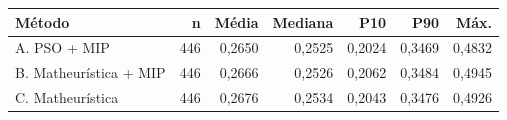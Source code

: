 \begin{tabular}{lrrrrrr}
\toprule
Método & n & Média & Mediana & P10 & P90 & Máx. \\
\midrule
A. PSO + MIP & 446 & 0,2650 & 0,2525 & 0,2024 & 0,3469 & 0,4832 \\
B. Matheurística + MIP & 446 & 0,2666 & 0,2526 & 0,2062 & 0,3484 & 0,4945 \\
C. Matheurística & 446 & 0,2676 & 0,2534 & 0,2043 & 0,3476 & 0,4926 \\
\bottomrule
\end{tabular}
